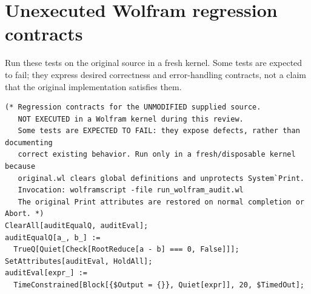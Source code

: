 \documentclass[11pt,letterpaper]{article}
\theoremstyle{definition}
\theoremstyle{remark}
\begin{document}
\section{Unexecuted Wolfram regression contracts}
\label{app:tests}
Run these tests on the original source in a fresh kernel. Some tests are
expected to fail; they express desired correctness and error-handling
contracts, not a claim that the original implementation satisfies them.
\lstset{firstnumber=1}
\begin{lstlisting}
(* Regression contracts for the UNMODIFIED supplied source.
   NOT EXECUTED in a Wolfram kernel during this review.
   Some tests are EXPECTED TO FAIL: they expose defects, rather than documenting
   correct existing behavior. Run only in a fresh/disposable kernel because
   original.wl clears global definitions and unprotects System`Print.
   Invocation: wolframscript -file run_wolfram_audit.wl
   The original Print attributes are restored on normal completion or Abort. *)
ClearAll[auditEqualQ, auditEval];
auditEqualQ[a_, b_] :=
  TrueQ[Quiet[Check[RootReduce[a - b] === 0, False]]];
SetAttributes[auditEval, HoldAll];
auditEval[expr_] :=
  TimeConstrained[Block[{$Output = {}}, Quiet[expr]], 20, $TimedOut];


\end{lstlisting}
\end{document}
